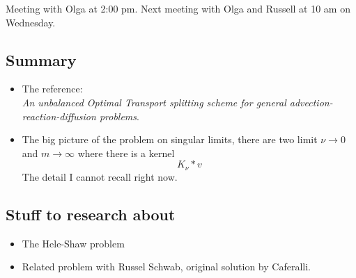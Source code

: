 

Meeting with Olga at 2:00 pm. Next meeting with Olga and Russell at 10 am on Wednesday.

\subsection{Summary}

\begin{itemize}
    \item The reference: \\
    \emph{An unbalanced Optimal Transport splitting scheme for general advection-reaction-diffusion problems}.
    \item The big picture of the problem on singular limits, there are two limit $\nu\to 0$ and $m\to \infty$ where there is a kernel
    \begin{equation*}
        K_\nu * v
    \end{equation*}
    The detail I cannot recall right now.
\end{itemize}

\subsection{Stuff to research about}
\begin{itemize}
    \item The Hele-Shaw problem
    \item Related problem with Russel Schwab, original solution by Caferalli.
\end{itemize}